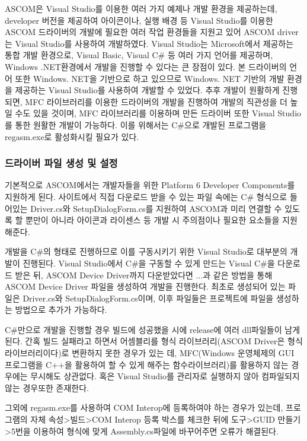 ASCOM은 Visual Studio를 이용한 여러 가지 예제나 개발 환경을 제공하는데, developer 버전을 제공하여 아이콘이나, 실행 배경 등 Visual Studio를 이용한 ASCOM 드라이버의 개발에 필요한 여러 작업 환경들을 지원고 있어 ASCOM driver는 Visual Studio를 사용하여 개발하였다. Visual Studio는 Microsoft에서 제공하는 통합 개발 환경으로, Visual Basic, Visual C\# 등 여러 가지 언어를 제공하며, Windows .NET환경에서 개발을 진행할 수 있다는 큰 장점이 있다. 본 드라이버의 언어 또한 Windows. NET을 기반으로 하고 있으므로 Windows. NET 기반의 개발 환경을 제공하는 Visual Studio를 사용하여 개발할 수 있었다. 추후 개발이 원활하게 진행되면, MFC 라이브러리를 이용한 드라이버의 개발을 진행하여 개발의 직관성을 더 높일 수도 있을 것이며, MFC 라이브러리를 이용하며 만든 드라이버 또한 Visual Studio를 통한 원활한 개발이 가능하다. 이를 위해서는 C\#으로 개발된 프로그램을 regasm.exe로 활성화시킬 필요가 있다.

\subsubsection{드라이버 파일 생성 및 설정}
기본적으로 ASCOM에서는 개발자들을 위한 Platform 6 Developer Components를 지원하게 된다. 사이트에서 직접 다운로드 받을 수 있는 파일 속에는 C\# 형식으로 들어있는 Driver.cs와 SetupDialogForm.cs를 지원하여 ASCOM과 미리 연결할 수 있도록 할 뿐만이 아니라 아이콘과 라이센스 등 개발 시 주의점이나 필요한 요소들을 지원해준다.

개발을 C\#의 형태로 진행하므로 이를 구동시키기 위한 Visual Studio로 대부분의 개발이 진행된다. Visual Studio에서 C\#을 구동할 수 있게 만드는 Visual C\#을 다운로드 받은 뒤, ASCOM Device Driver까지 다운받았다면 ...과 같은 방법을 통해 ASCOM Device Driver 파일을 생성하여 개발을 진행한다. 최초로 생성되어 있는 파일은 Driver.cs와 SetupDialogForm.cs이며, 이후 파일들은 프로젝트에 파일을 생성하는 방법으로 추가가 가능하다.

C\#만으로 개발을 진행할 경우 빌드에 성공했을 시에 release에 여러 dll파일들이 남게 된다. 간혹 빌드 실패라고 하면서 어셈블리를 형식 라이브러리(ASCOM Driver은 형식 라이브러리이다)로 변환하지 못한 경우가 있는 데, MFC(Windows 운영체제의 GUI 프로그램을  C++을 활용하여 할 수 있게 해주는 함수라이브러리)를 활용하지 않는 경우에는 무시해도 상관없다. 혹은 Visual Studio를 관리자로 실행하지 않아 컴파일되지 않는 경우또한 존재한다.

그외에 regasm.exe를 사용하여 COM Interop에 등록하여야 하는 경우가 있는데, 프로그램의 자체 속성>빌드>COM Interop 등록 박스를 체크한 뒤에 도구>GUID 만들기>5번을 이용하여 형식에 맞게 Assembly.cs파일에 바꾸어주면 오류가 해결된다.

